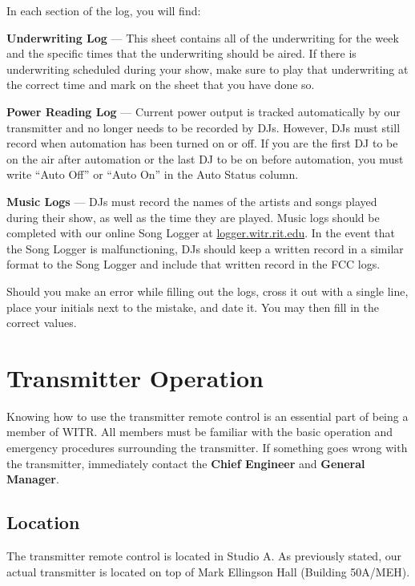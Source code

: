 \documentclass{witrman}
\begin{document}
In each section of the log, you will find:
\begin{skinnyitemize}
    \item \textbf{Underwriting Log} --- This sheet contains all of the
        underwriting for the week and the specific times that the underwriting
        should be aired. If there is underwriting scheduled during your show,
        make sure to play that underwriting at the correct time and mark on the
        sheet that you have done so.
    \item \textbf{Power Reading Log} --- Current power output is tracked
        automatically by our transmitter and no longer needs to be recorded by
        DJs.  However, DJs must still record when automation has been turned on
        or off. If you are the first DJ to be on the air after automation or the
        last DJ to be on before automation, you must write ``Auto Off'' or
        ``Auto On'' in the Auto Status column.
    \item \textbf{Music Logs} --- DJs must record the names of the artists and
        songs played during their show, as well as the time they are played.
        Music logs should be completed with our online Song Logger at
        \href{http://logger.witr.rit.edu}{logger.witr.rit.edu}. In the event
        that the Song Logger is malfunctioning, DJs should keep a written record
        in a similar format to the Song Logger and include that written record
        in the FCC logs.
\end{skinnyitemize}

Should you make an error while filling out the logs, cross it out with a single
line, place your initials next to the mistake, and date it. You may then fill in
the correct values.

\chapter{Transmitter Operation}
Knowing how to use the transmitter remote control is an essential part of being
a member of WITR. All members must be familiar with the basic operation and
emergency procedures surrounding the transmitter. If something goes wrong with
the transmitter, immediately contact the \textbf{Chief Engineer} and
\textbf{General Manager}.

\section{Location}
The transmitter remote control is located in Studio A. As previously stated, our
actual transmitter is located on top of Mark Ellingson Hall (Building 50A/MEH).
\end{document}
